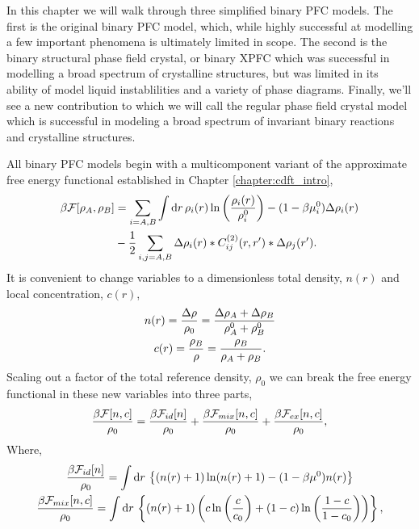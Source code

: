 \label{chapter:binary}

In this chapter we will walk through three simplified binary PFC models. The
first is the original binary PFC model, which, while highly successful at
modelling a few important phenomena is ultimately limited in scope. The second
is the binary structural phase field crystal, or binary XPFC which was
successful in modelling a broad spectrum of crystalline structures, but was
limited in its ability of model liquid instablilities and a variety of phase
diagrams. Finally, we'll see a new contribution to which we will call the
regular phase field crystal model which is successful in modeling a broad
spectrum of invariant binary reactions and crystalline structures. 

All binary PFC models begin with a multicomponent variant of the approximate
free energy functional established in Chapter \ref{chapter:cdft_intro},
%
\begin{align}
    \label{binary_cdft_free_energy}
    \beta\mathcal{F}[\rho_A, \rho_B] &= \sum_{i=A, B} \int \mathrm{d}r 
        \,\rho_i(r) \ln\left(\frac{\rho_i(r)}{\rho_i^0}\right) 
        - (1 - \beta\mu_i^0)\Delta\rho_i(r)\\
    &- \frac{1}{2} \sum_{i,j=A, B} \Delta\rho_i(r) \ast C^{(2)}_{ij}(r, r^\prime) 
        \ast \Delta\rho_j(r^\prime). \nonumber
\end{align}
%
It is convenient to change variables to a dimensionless total density, $n(r)$
and local concentration, $c(r)$,
%
\begin{gather}
    n(r) = \frac{\Delta \rho}{\rho_0} = \frac{\Delta\rho_A + \Delta\rho_B}{\rho_A^0 + \rho_B^0} \\
    c(r) = \frac{\rho_B}{\rho} = \frac{\rho_B}{\rho_A + \rho_B}.
\end{gather}
%
Scaling out a factor of the total reference density, $\rho_0$ we can break the
free energy functional in these new variables into three parts,
%
\begin{equation}
    \label{binary_total_free_energy}
    \frac{\beta\mathcal{F}[n, c]}{\rho_0} = \frac{\beta\mathcal{F}_{id}[n]}{\rho_0} 
        + \frac{\beta\mathcal{F}_{mix}[n, c]}{\rho_0}
        + \frac{\beta\mathcal{F}_{ex}[n, c]}{\rho_0},
\end{equation}
%
Where,
%
\begin{gather}
    \label{binary_ideal}
    \frac{\beta\mathcal{F}_{id}[n]}{\rho_0} =
        \int \mathrm{d}r \,\left\lbrace (n(r) + 1)\ln(n(r) + 1) 
        - (1 - \beta\mu^0)n(r) \right\rbrace \\
    \label{binary_mixing}
    \frac{\beta\mathcal{F}_{mix}[n, c]}{\rho_0} =
        \int \mathrm{d}r \,\left\lbrace (n(r) + 1)\left( 
            c\ln\left(\frac{c}{c_0}\right) + (1-c)\ln\left(\frac{1-c}{1-c_0}\right) \right)\right\rbrace, 
\end{gather}
